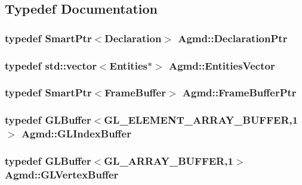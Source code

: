 \subsection{Typedef Documentation}
\hypertarget{namespace_agmd_a7784897efe9624596f7980eef99ace59}{
\subsubsection[{Declaration\+Ptr}]{\setlength{\rightskip}{0pt plus 5cm}typedef {\bf Smart\+Ptr}$<${\bf Declaration}$>$ {\bf Agmd\+::\+Declaration\+Ptr}}}\label{namespace_agmd_a7784897efe9624596f7980eef99ace59}
\hypertarget{namespace_agmd_aa240b1f8247099cfd97030903ede36b2}{
\subsubsection[{Entities\+Vector}]{\setlength{\rightskip}{0pt plus 5cm}typedef std\+::vector$<${\bf Entities}$\ast$$>$ {\bf Agmd\+::\+Entities\+Vector}}}\label{namespace_agmd_aa240b1f8247099cfd97030903ede36b2}
\hypertarget{namespace_agmd_a6a2089580a8bf36738ed6935796b515d}{
\subsubsection[{Frame\+Buffer\+Ptr}]{\setlength{\rightskip}{0pt plus 5cm}typedef {\bf Smart\+Ptr}$<${\bf Frame\+Buffer}$>$ {\bf Agmd\+::\+Frame\+Buffer\+Ptr}}}\label{namespace_agmd_a6a2089580a8bf36738ed6935796b515d}
\hypertarget{namespace_agmd_a3039cf74b20e860514cf4997b04e85b4}{
\subsubsection[{G\+L\+Index\+Buffer}]{\setlength{\rightskip}{0pt plus 5cm}typedef {\bf G\+L\+Buffer}$<$G\+L\+\_\+\+E\+L\+E\+M\+E\+N\+T\+\_\+\+A\+R\+R\+A\+Y\+\_\+\+B\+U\+F\+F\+E\+R,1$>$ {\bf Agmd\+::\+G\+L\+Index\+Buffer}}}\label{namespace_agmd_a3039cf74b20e860514cf4997b04e85b4}
\hypertarget{namespace_agmd_afae8d1b62c9b9eb380f73f5c34876c65}{
\subsubsection[{G\+L\+Vertex\+Buffer}]{\setlength{\rightskip}{0pt plus 5cm}typedef {\bf G\+L\+Buffer}$<$G\+L\+\_\+\+A\+R\+R\+A\+Y\+\_\+\+B\+U\+F\+F\+E\+R,1$>$ {\bf Agmd\+::\+G\+L\+Vertex\+Buffer}}}\label{namespace_agmd_afae8d1b62c9b9eb380f73f5c34876c65}
